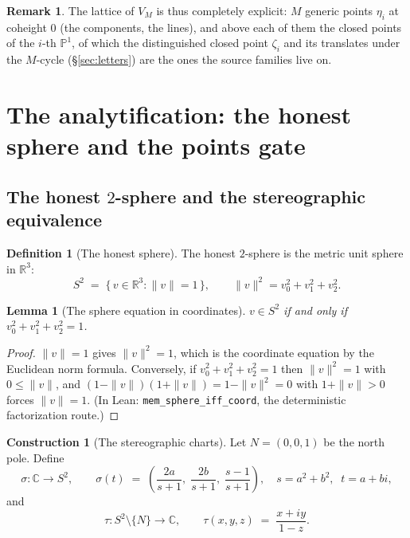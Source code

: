 \documentclass[11pt,a4paper]{article}
\theoremstyle{plain}
\newtheorem{lemma}[theorem]{Lemma}
\theoremstyle{definition}
\newtheorem{definition}[theorem]{Definition}
\newtheorem{construction}[theorem]{Construction}
\newtheorem{remark}[theorem]{Remark}
\newcommand{\C}{\mathbb{C}}
\newcommand{\R}{\mathbb{R}}
\newcommand{\PP}{\mathbb{P}}
\begin{document}
\begin{remark}
The lattice of $V_M$ is thus completely explicit: $M$ generic points
$\eta_i$ at coheight $0$ (the components, the lines), and above each
of them the closed points of the $i$-th $\PP^1$, of which the
distinguished closed point $\zeta_i$ and its translates under the
$M$-cycle (\S\ref{sec:letters}) are the ones the source families
live on.
\end{remark}

\section{The analytification: the honest sphere and the points gate}
\label{sec:analytification}

\subsection{The honest $2$-sphere and the stereographic equivalence}

\begin{definition}[The honest sphere]\label{def:sphere}
The honest $2$-sphere is the metric unit sphere in
$\R^3$:
\[
S^2 \;=\; \{\, v \in \R^3 : \|v\| = 1 \,\}, \qquad
\|v\|^2 = v_0^2 + v_1^2 + v_2^2 .
\]
\end{definition}

\begin{lemma}[The sphere equation in coordinates]\label{lem:sphere-coord}
$v \in S^2$ if and only if $v_0^2 + v_1^2 + v_2^2 = 1$.
\end{lemma}

\begin{proof}
$\|v\| = 1$ gives $\|v\|^2 = 1$, which is the coordinate equation by
the Euclidean norm formula.  Conversely, if $v_0^2+v_1^2+v_2^2 = 1$
then $\|v\|^2 = 1$ with $0 \le \|v\|$, and
$(1-\|v\|)(1+\|v\|) = 1 - \|v\|^2 = 0$ with $1 + \|v\| > 0$ forces
$\|v\| = 1$.  (In Lean: \texttt{mem\_sphere\_iff\_coord}, the
deterministic factorization route.)
\end{proof}

\begin{construction}[The stereographic charts]\label{con:stereo}
Let $N = (0,0,1)$ be the north pole.  Define
\[
\sigma : \C \longrightarrow S^2, \qquad
\sigma(t) \;=\; \left( \frac{2a}{s+1},\; \frac{2b}{s+1},\;
\frac{s-1}{s+1} \right), \quad
s = a^2 + b^2, \;\; t = a + bi,
\]
and
\[
\tau : S^2 \setminus \{N\} \longrightarrow \C, \qquad
\tau(x,y,z) \;=\; \frac{x + iy}{1 - z} .
\]
\end{construction}
\end{document}
